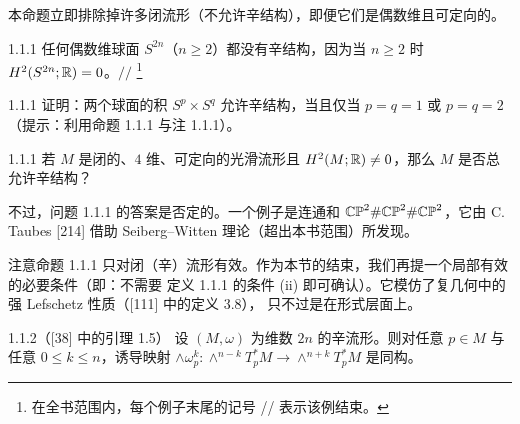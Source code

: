 本命题立即排除掉许多闭流形（不允许辛结构），即便它们是偶数维且可定向的。

\begin{wexam}{1.1.1}
任何偶数维球面 $S^{2n}$（$n\ge2$）都没有辛结构，因为当 $n\ge2$ 时 $H^2(S^{2n};\mathbb{R})=0$。\hfill$//$
\footnote{在全书范围内，每个例子末尾的记号 // 表示该例结束。}
\end{wexam}

\begin{wexer}{1.1.1}
证明：两个球面的积 $S^p\times S^q$ 允许辛结构，当且仅当 $p=q=1$ 或 $p=q=2$（提示：利用命题 1.1.1
与注 1.1.1）。
\end{wexer}

\begin{wque}{1.1.1}
若 $M$ 是闭的、$4$ 维、可定向的光滑流形且 $H^2(M;\mathbb{R})\neq0$，那么 $M$ 是否总允许辛结构？
\end{wque}

不过，问题 1.1.1 的答案是否定的。一个例子是连通和 $\mathbb{CP}^2\#\mathbb{CP}^2\#\mathbb{CP}^2$，它由 C. Taubes [214]
借助 Seiberg--Witten 理论（超出本书范围）所发现。

注意命题 1.1.1 只对闭（辛）流形有效。作为本节的结束，我们再提一个局部有效的必要条件（即：不需要
定义 1.1.1 的条件 (ii) 即可确认）。它模仿了复几何中的强 Lefschetz 性质（[111] 中的定义 3.8），
只不过是在形式层面上。

\begin{wprop}{1.1.2}（[38] 中的引理 1.5）
设 $(M,\omega)$ 为维数 $2n$ 的辛流形。则对任意 $p\in M$ 与任意 $0\le k\le n$，诱导映射
$\wedge\omega_p^k:\wedge^{n-k}T_p^*M\to\wedge^{n+k}T_p^*M$ 是同构。
\end{wprop}

